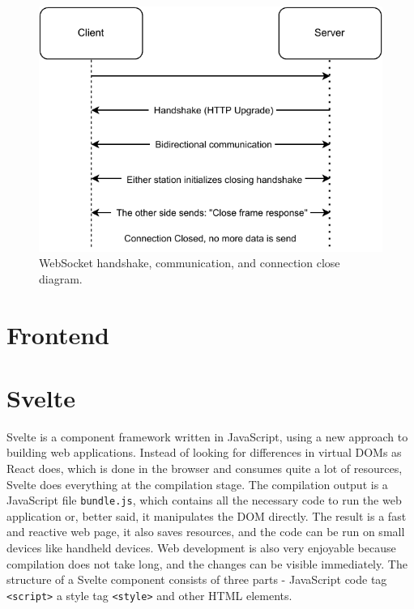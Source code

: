 \begin{figure}[h]
    \centering
    \includegraphics{pdf/websocket.drawio.pdf}
    \caption{WebSocket handshake, communication, and connection close diagram.}
    \label{fig:websocket}
\end{figure}



\section{Frontend}\label{txt.design.frontend}
\section{Svelte}\label{txt.design.frontend.svelte}

Svelte is a component framework written in JavaScript, using a new approach to building web applications. Instead of looking for differences in virtual DOMs as React does, which is done in the browser and consumes quite a lot of resources, Svelte does everything at the compilation stage. The compilation output is a JavaScript file \verb|bundle.js|, which contains all the necessary code to run the web application or, better said, it manipulates the DOM directly. The result is a fast and reactive web page, it also saves resources, and the code can be run on small devices like handheld devices. Web development is also very enjoyable because compilation does not take long, and the changes can be visible immediately. The structure of a Svelte component consists of three parts - JavaScript code tag \verb|<script>| a style tag \verb|<style>| and other HTML elements. 

